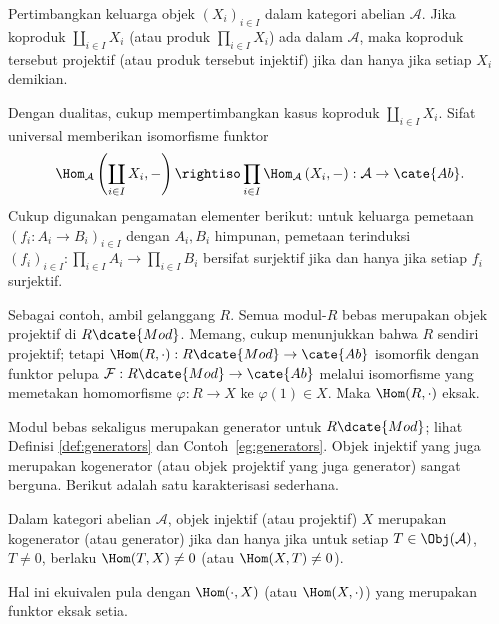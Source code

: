 \begin{lema}\label{prop:prod-injective-projective}
Pertimbangkan keluarga objek $(X_i)_{i\in I}$ dalam kategori abelian
$\mathcal{A}$. Jika koproduk $\coprod_{i\in I}X_i$ (atau produk
	$\prod_{i\in I}X_i$) ada dalam $\mathcal{A}$, maka koproduk tersebut projektif
(atau produk tersebut injektif) jika dan hanya jika setiap $X_i$ demikian.
\end{lema}

\begin{bukti}
Dengan dualitas, cukup mempertimbangkan kasus koproduk
$\coprod_{i\in I}X_i$. Sifat universal memberikan isomorfisme funktor
\[
\Hom_{\mathcal{A}}\left(\coprod_{i\in I}X_i,-\right)
\rightiso\prod_{i\in I}\Hom_{\mathcal{A}}\left(X_i,-\right):
\mathcal{A}\to\cate{Ab}.
\]
Cukup digunakan pengamatan elementer berikut: untuk keluarga
pemetaan $(f_i:A_i\to B_i)_{i\in I}$ dengan $A_i,B_i$ himpunan, pemetaan terinduksi
$(f_i)_{i\in I}:\prod_{i\in I}A_i\to\prod_{i\in I}B_i$ bersifat surjektif jika dan
hanya jika setiap $f_i$ surjektif.
\end{bukti}

Sebagai contoh, ambil gelanggang $R$. Semua modul-$R$ bebas merupakan objek
projektif di $R\dcate{Mod}$. Memang, cukup menunjukkan bahwa $R$ sendiri
projektif; tetapi $\Hom(R,\cdot):R\dcate{Mod}\to\cate{Ab}$ isomorfik dengan funktor
pelupa $\mathcal{F}:R\dcate{Mod}\to\cate{Ab}$ melalui isomorfisme yang memetakan
homomorfisme $\varphi:R\to X$ ke $\varphi(1)\in X$. Maka $\Hom(R,\cdot)$ eksak.

Modul bebas sekaligus merupakan generator untuk $R\dcate{Mod}$; lihat Definisi
\ref{def:generators} dan Contoh~\ref{eg:generators}. Objek injektif yang juga
merupakan kogenerator (atau objek projektif yang juga generator) sangat berguna.
Berikut adalah satu karakterisasi sederhana.

\begin{proposisi}\label{prop:injective-cogenerator}
Dalam kategori abelian $\mathcal{A}$, objek injektif (atau projektif) $X$
merupakan kogenerator (atau generator) jika dan hanya jika untuk setiap
$T\in\Obj(\mathcal{A})$, $T\neq0$, berlaku $\Hom(T,X)\neq0$ (atau
$\Hom(X,T)\neq0$).

Hal ini ekuivalen pula dengan $\Hom(\cdot,X)$ (atau $\Hom(X,\cdot)$) yang
merupakan funktor eksak setia.
\end{proposisi}


